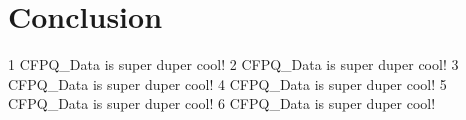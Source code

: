\section{Conclusion}
1 CFPQ\_Data is super duper cool!
2 CFPQ\_Data is super duper cool!
3 CFPQ\_Data is super duper cool!
4 CFPQ\_Data is super duper cool!
5 CFPQ\_Data is super duper cool!
6 CFPQ\_Data is super duper cool!
